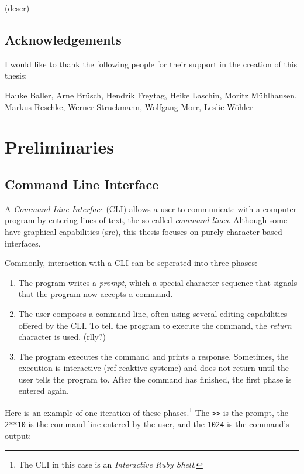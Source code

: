\documentclass[a4paper,twoside,abstract=on,cleardoublepage=empty,numbers=noenddot,toc=bib]{scrreprt}
\begin{document}
(descr)

\section{Acknowledgements}

I would like to thank the following people for their support in the creation of this thesis:

Hauke Baller,
Arne Brüsch,
Hendrik Freytag,
Heike Laschin,
Moritz Mühlhausen,
Markus Reschke,
Werner Struckmann,
Wolfgang Morr,
Leslie Wöhler


\chapter{Preliminaries}

\section{Command Line Interface}

A \emph{Command Line Interface} (\textsc{CLI}) allows a user to communicate with a computer program by entering lines of text, the so-called \emph{command lines}. Although some have graphical capabilities (src), this thesis focuses on purely character-based interfaces.

Commonly, interaction with a \textsc{CLI} can be seperated into three phases:

\begin{enumerate}
    \item The program writes a \emph{prompt}, which a special character sequence that signals that the program now accepts a command.
    \item The user composes a command line, often using several editing capabilities offered by the CLI. To tell the program to execute the command, the \emph{return} character is used. (rlly?)
    \item The program executes the command and prints a response. Sometimes, the execution is interactive (ref reaktive systeme) and does not return until the user tells the program to. After the command has finished, the first phase is entered again.
\end{enumerate}

Here is an example of one iteration of these phases.\footnote{The \textsc{CLI} in this case is an \emph{Interactive Ruby Shell}.} The \texttt{>\->} is the prompt, the \texttt{2**10} is the command line entered by the user, and the \texttt{1024} is the command's output:
\end{document}
